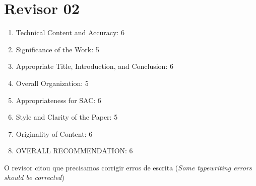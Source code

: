 \section{Revisor 02}
\begin{frame}
	\begin{enumerate}
		\item Technical Content and Accuracy: 6
		\item Significance of the Work: 5
		\item Appropriate Title, Introduction, and Conclusion: 6
		\item Overall Organization: 5
		\item Appropriateness for SAC: 6
		\item Style and Clarity of the Paper: 5
		\item Originality of Content: 6
		\item OVERALL RECOMMENDATION: 6
	\end{enumerate}
	O revisor citou que precisamos corrigir erros de escrita (\emph{Some typewriting errors should be corrected})
\end{frame}

